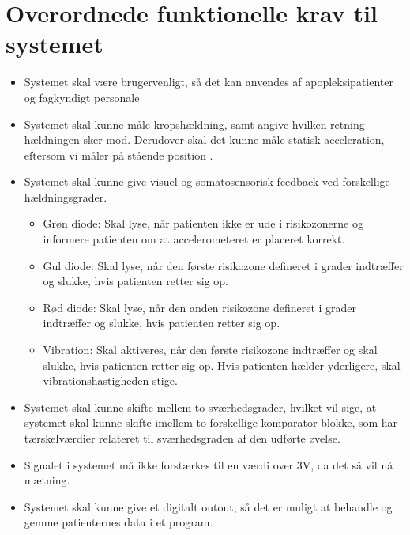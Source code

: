 \section{Overordnede funktionelle krav til systemet}\label{FunkKrav}
\begin{itemize}
	\item Systemet skal være brugervenligt, så det kan anvendes af apopleksipatienter og fagkyndigt personale
	\item Systemet skal kunne måle kropshældning, samt angive hvilken retning hældningen sker mod. Derudover skal det kunne måle statisk acceleration, eftersom vi måler på stående position .
	\item Systemet skal kunne give visuel og somatosensorisk feedback ved forskellige hældningsgrader.
	\begin{itemize}
		\item Grøn diode: Skal lyse, når patienten ikke er ude i risikozonerne og informere patienten om at accelerometeret er placeret korrekt.  
		\item Gul diode: Skal lyse, når den første risikozone defineret i grader indtræffer og slukke, hvis patienten retter sig op.
		\item Rød diode: Skal lyse, når den anden risikozone defineret i grader indtræffer og slukke, hvis patienten retter sig op.
		\item Vibration: Skal aktiveres, når den første risikozone indtræffer og skal slukke, hvis patienten retter sig op. Hvis patienten hælder yderligere, skal vibrationshastigheden stige.
	\end{itemize}
	\item Systemet skal kunne skifte mellem to sværhedsgrader, hvilket vil sige, at systemet skal kunne skifte imellem to forskellige komparator blokke, som har tærskelværdier relateret til sværhedsgraden af den udførte øvelse.
	\item Signalet i systemet må ikke forstærkes til en værdi over 3V, da det så vil nå mætning.
	\item Systemet skal kunne give et digitalt outout, så det er muligt at behandle og gemme patienternes data i et program.
\end{itemize}

